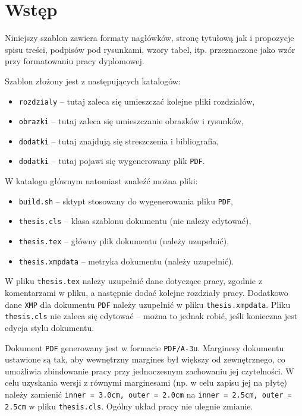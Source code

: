\chapter{Wstęp}

Niniejszy szablon zawiera formaty nagłówków, stronę tytułową jak i propozycje spisu treści, podpisów pod rysunkami, wzory tabel, itp. przeznaczone jako wzór przy formatowaniu pracy dyplomowej.

Szablon złożony jest z następujących katalogów:
\begin{itemize}
\item \verb|rozdzialy| -- tutaj zaleca się umieszczać kolejne pliki rozdziałów,
\item \verb|obrazki|   -- tutaj zaleca się umieszczanie obrazków i rysunków,
\item \verb|dodatki|   -- tutaj znajdują się streszczenia i bibliografia,
\item \verb|dodatki|   -- tutaj pojawi się wygenerowany plik \verb|PDF|.
\end{itemize}

W katalogu głównym natomiast znaleźć można pliki:
\begin{itemize}
\item \verb|build.sh|       -- sktypt stosowany do wygenerowania pliku \verb|PDF|,
\item \verb|thesis.cls|     -- klasa szablonu dokumentu (nie należy edytować),
\item \verb|thesis.tex|     -- główny plik dokumentu (należy uzupełnić),
\item \verb|thesis.xmpdata| -- metryka dokumentu (należy uzupełnić).
\end{itemize}

W pliku \verb|thesis.tex| należy uzupełnić dane dotyczące pracy, zgodnie z komentarzami w pliku, a następnie dodać kolejne rozdziały pracy. Dodatkowo dane \verb|XMP| dla dokumentu \verb|PDF| należy uzupełnić w pliku \verb|thesis.xmpdata|. Pliku \verb|thesis.cls| nie zaleca się edytować -- można to jednak robić, jeśli konieczna jest edycja stylu dokumentu.

Dokument \verb|PDF| generowany jest w formacie \verb|PDF/A-3u|. Marginesy dokumentu ustawione są tak, aby wewnętrzny margines był większy od zewnętrznego, co umożliwia zbindowanie pracy przy jednoczesnym zachowaniu jej czytelności. W celu uzyskania wersji z równymi marginesami (np. w celu zapisu jej na płytę) należy zamienić \verb|inner = 3.0cm, outer = 2.0cm| na \verb|inner = 2.5cm, outer = 2.5cm| w pliku \verb|thesis.cls|. Ogólny układ pracy nie ulegnie zmianie.
